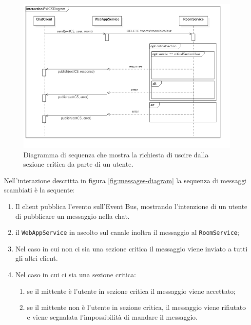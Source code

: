 \documentclass[a4paper]{article}
\begin{document}
\begin{figure}[H]
    \centering
    \includegraphics[width=\linewidth, height=\textheight, keepaspectratio]{res/ExitCSDiagram.png}
        \caption{Diagramma di sequenza che mostra la richiesta di uscire dalla sezione critica da parte di un utente.}
    \label{fig:exitCS-diagram}
\end{figure}

Nell'interazione descritta in figura \ref{fig:messages-diagram} la sequenza di messaggi scambiati è la sequente:
\begin{enumerate}[label=(\arabic*)]
%
    \item Il client pubblica l'evento sull'Event Bus, mostrando l'intenzione di un utente di pubblicare un messaggio nella chat.
%
    \item il \texttt{WebAppService} in ascolto sul canale inoltra il messaggio al \texttt{RoomService}; 
%
    \item Nel caso in cui non ci sia una sezione critica il messaggio viene inviato a tutti gli altri client.
%
    \item Nel caso in cui ci sia una sezione critica:
        \begin{enumerate}
            \item se il mittente è l'utente in sezione critica il messaggio viene accettato;
%
            \item se il mittente non è l'utente in sezione critica, il messaggio viene rifiutato e viene segnalata l'impossibilità di mandare il messaggio.
%
        \end{enumerate}
\end{enumerate}
\end{document}
